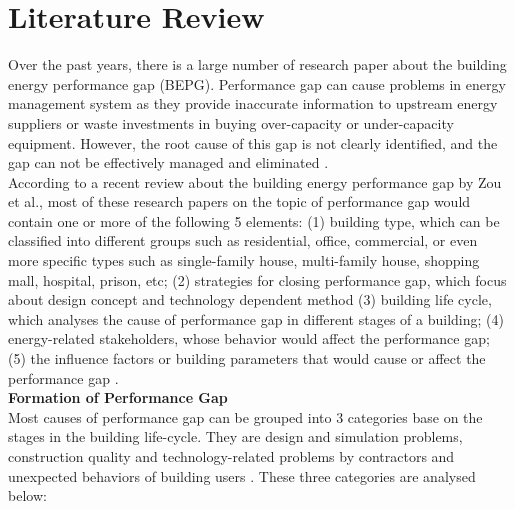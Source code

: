 \documentclass[a4paper, oneside]{discothesis}
\begin{document}
\chapter{Literature Review}
	Over the past years, there is a large number of research paper about the building energy performance gap (BEPG). Performance gap can cause problems in energy management system as they provide inaccurate information to upstream energy suppliers or waste investments in buying over-capacity or under-capacity equipment. However, the root cause of this gap is not clearly identified, and the gap can not be effectively managed and eliminated \cite{FREI2017421}.\\
	
	According to a recent review about the building energy performance gap by Zou et al.\cite{ZOU2018165}, most of these research papers on the topic of performance gap would contain one or more of the following 5 elements: (1) building type, which can be classified into different groups such as residential, office, commercial, or even more specific types such as single-family house, multi-family house, shopping mall, hospital, prison, etc; (2) strategies for closing performance gap, which focus about design concept and technology dependent method (3) building life cycle, which analyses the cause of performance gap in different stages of a building; (4) energy-related stakeholders, whose behavior would affect the performance gap; (5) the influence factors or building parameters that would cause or affect the performance gap \cite{FREI2017421,ZOU2018165}.\\
	
	\textbf{Formation of Performance Gap}\\
		Most causes of performance gap can be grouped into 3 categories base on the stages in the building life-cycle. They are design and simulation problems, construction quality and technology-related problems by contractors and unexpected behaviors of building users \cite{userevaluations,NIU2016275}. These three categories are analysed below:\\
		
\end{document}
